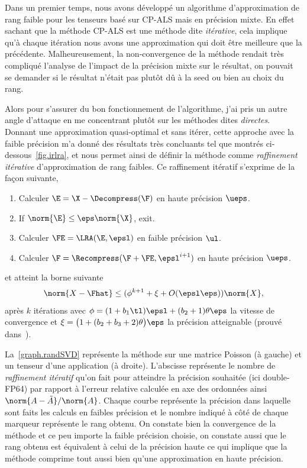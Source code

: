 Dans un premier temps, nous avons développé un algorithme d'approximation de
rang faible pour les tenseurs basé sur CP-ALS mais en précision mixte. En effet
sachant que la méthode CP-ALS est une méthode dite \textit{itérative}, cela
implique qu'à chaque itération nous avons une approximation qui doit être
meilleure que la précédente. Malheureusement, la non-convergence de la méthode
rendait très compliqué l'analyse de l'impact de la précision mixte sur le
résultat, on pouvait se demander si le résultat n'était pas plutôt dû à la seed
ou bien au choix du rang.

Alors pour s'assurer du bon fonctionnement de l'algorithme, j'ai pris un autre
angle d'attaque en me concentrant plutôt sur les méthodes dites
\textit{directes}. Donnant une approximation quasi-optimal et sans itérer,
cette approche avec la faible précision m'a donné des résultats très concluants
tel que montrés ci-dessous~\cref{fig.irlra}, et nous permet ainsi de définir la
méthode comme \textit{raffinement itérative} d'approximation de rang faibles.
Ce raffinement itératif s'exprime de la façon suivante,
\begin{enumerate}
    \item Calculer $\E = \X - \Decompress(\F)$ en haute précision
          $\ueps$.\label{line.decompress}
    \item If $\norm{\E} \le \eps\norm{\X}$, exit.\label{line.stop}
    \item Calculer $\FE = \LRA(\E, \epsl)$ en faible précision $\ul$.\label{line.FE}
    \item Calculer $\F = \Recompress(\F + \FE, \epsl^{i+1})$ en haute précision
          $\ueps$.\label{line.recompress}
\end{enumerate}
et atteint la borne suivante
\begin{equation}\label{eq.Fhat}
    \norm{X-\Fhat} \le (\phi^{k+1} + \xi + O(\epsl\eps))\norm{X},
\end{equation}
après $k$ itérations avec $\phi = (1+b_1\tl)\epsl + (b_2+1)\theta\eps$ la
vitesse de convergence et $\xi = \big(1+(b_2+b_3+2)\theta\big)\eps$ la
précision atteignable (prouvé dans~\cite[Théoreme 2.1]{bkmr23}).

La~\cref{graph.randSVD} représente la méthode sur une matrice Poisson (à
gauche) et un tenseur d'une application (à droite). L'abscisse représente le
nombre de \textit{raffinement itératif} qu'on fait pour atteindre la précision
souhaitée (ici double-FP64) par rapport à l'erreur relative calculée en axe des
ordonnées ainsi $\norm{A - \tilde{A}}/\norm{A}$. Chaque courbe représente la
précision dans laquelle sont faits les calculs en faibles précision et le
nombre indiqué à côté de chaque marqueur représente le rang obtenu. On constate
bien la convergence de la méthode et ce peu importe la faible précision
choisie, on constate aussi que le rang obtenu est équivalent à celui de la
précision haute ce qui implique que la méthode comprime tout aussi bien qu'une
approximation en haute précision.

